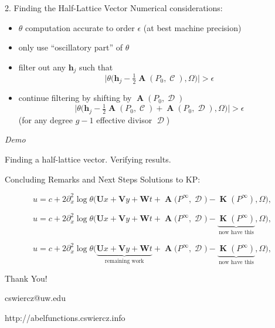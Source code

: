 \documentclass{beamer}
\DeclareMathOperator{\DivC}{\mathcal{C}}
\DeclareMathOperator{\DivD}{\mathcal{D}}
\DeclareMathOperator{\RCV}{\boldsymbol{K}}
\DeclareMathOperator{\Abel}{\boldsymbol{A}}
\begin{document}
\begin{frame}{2. Finding the Half-Lattice Vector}{}
  Numerical considerations:
  \begin{itemize}[<+->]
  \item $\theta$ computation accurate to order $\epsilon$ (at best machine
    precision)
  \item only use ``oscillatory part'' of $\theta$
  \item filter out any $\boldsymbol{h}_j$ such that
    \[
    \bigg|
    \theta \big(
    \boldsymbol{h}_j - \tfrac{1}{2} \Abel(P_0,\DivC), \Omega
    \big)
    \bigg| > \epsilon
    \]
  \item continue filtering by shifting by $\Abel(P_0,\DivD)$
    \[
    \bigg|
    \theta \big(
    \boldsymbol{h}_j - \tfrac{1}{2} \Abel(P_0,\DivC) + \Abel(P_0,\DivD), \Omega
    \big)
    \bigg| > \epsilon
    \]
    (for any degree $g-1$ effective divisor $\DivD$)
  \end{itemize}
\end{frame}


\begin{frame}
  \vspace{32pt}
  \begin{center}
    {\Huge \it Demo}

    \vspace{24pt}

    Finding a half-lattice vector. Verifying results.
  \end{center}
\end{frame}


\begin{frame}{Concluding Remarks and Next Steps}{}
  Solutions to KP:
  \begin{overprint}
  \[
  u = c + 2 \partial_x^2 \log \theta\Big(
  \boldsymbol{U}x + \boldsymbol{V}y + \boldsymbol{W}t
  + \Abel\big(P^\infty, \DivD\big) -
  \RCV(P^\infty)
  , \Omega \Big),
  \]

  \[
  u = c + 2 \partial_x^2 \log \theta\Big(
  \boldsymbol{U}x + \boldsymbol{V}y + \boldsymbol{W}t
  + \Abel\big(P^\infty, \DivD\big) -
  \underbrace{
    \RCV(P^\infty)}_\text{now have this}
  , \Omega \Big),
  \]

  \[
  u = c + 2 \partial_x^2 \log \theta\Big(
  \underbrace{
    \boldsymbol{U}x + \boldsymbol{V}y + \boldsymbol{W}t}_\text{remaining work}
  + \Abel\big(P^\infty, \DivD\big) -
  \underbrace{
    \RCV(P^\infty)}_\text{now have this}
  , \Omega \Big),
  \]

  \end{overprint}
\end{frame}


\begin{frame}
  \vspace{32pt}
  \begin{center}
    {\Huge Thank You!}

    \vspace{24pt}

    {cswiercz@uw.edu}

    \vspace{12pt}

    {http://abelfunctions.cswiercz.info}
  \end{center}
\end{frame}




\end{document}
